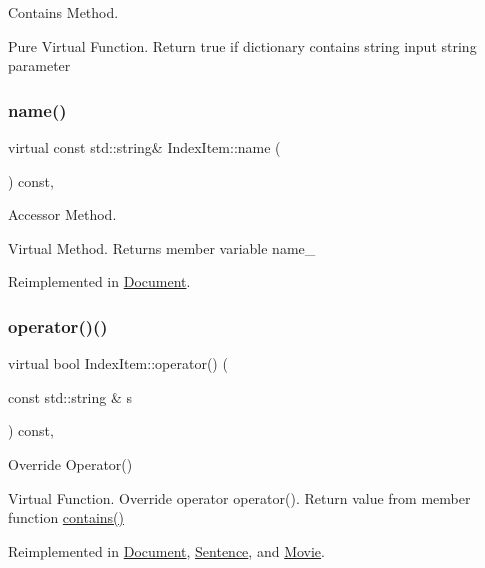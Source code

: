 Contains Method. 

Pure Virtual Function. Return true if dictionary contains string input string parameter \mbox{\label{class_index_item_a059cbae312c51ae7d02050f8f325bf93}} 
\subsubsection{\texorpdfstring{name()}{name()}}
{\footnotesize\ttfamily virtual const std\+::string\& Index\+Item\+::name (\begin{DoxyParamCaption}{ }\end{DoxyParamCaption}) const\hspace{0.3cm}{\ttfamily [inline]}, {\ttfamily [virtual]}}



Accessor Method. 

Virtual Method. Returns member variable name\+\_\+ 

Reimplemented in \hyperlink{class_document_a68936706468433f1bbba813797e32bd5}{Document}.

\mbox{\label{class_index_item_a38ccc46639b8d0b066024bad728c1bfa}} 
\subsubsection{\texorpdfstring{operator()()}{operator()()}}
{\footnotesize\ttfamily virtual bool Index\+Item\+::operator() (\begin{DoxyParamCaption}\item[{const std\+::string \&}]{s }\end{DoxyParamCaption}) const\hspace{0.3cm}{\ttfamily [inline]}, {\ttfamily [virtual]}}



Override Operator() 

Virtual Function. Override operator operator(). Return value from member function \hyperlink{class_index_item_a534d96bf041a485ed124663b9cded2fb}{contains()} 

Reimplemented in \hyperlink{class_document_a44b8141f08f57f9122b3dba4a59bf7e4}{Document}, \hyperlink{class_sentence_aacbd8da0eeadd6a544f00c7ea4169c79}{Sentence}, and \hyperlink{class_movie_a2ccd49265baa8fe6c51f8f4953f20bca}{Movie}.

